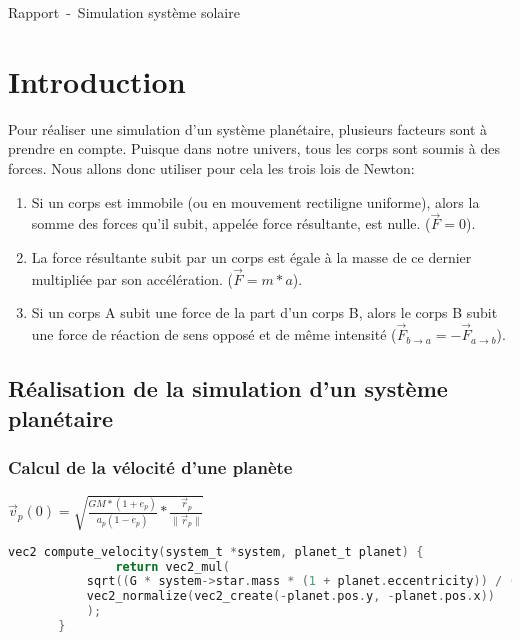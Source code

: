 \documentclass[a4paper,10pt]{article}
\title{\doctitle}
\author{\docauthor}
\date{\docdate}
\newcommand{\doctitle}{Rapport}
\newcommand{\docsubtitle}{Simulation système solaire}
\begin{document}
    \begin{center}
    {\huge \doctitle~-~\docsubtitle}\newline
    \end{center}

    \tableofcontents

    \newpage

    \section{Introduction}

    Pour réaliser une simulation d'un système planétaire, plusieurs facteurs sont à prendre en compte.
    Puisque dans notre univers, tous les corps sont soumis à des forces.
    Nous allons donc utiliser pour cela les trois lois de Newton:

    \begin{enumerate}
        \item Si un corps est immobile (ou en mouvement rectiligne uniforme), alors la somme des forces qu’il subit, appelée force résultante, est nulle. ($\vec{F} = 0$).
        \item La force résultante subit par un corps est égale à la masse de ce dernier multipliée par son accélération. ($\vec{F} = m * a$).
        \item Si un corps A subit une force de la part d’un corps B, alors le corps B subit une force de réaction de sens opposé et de même intensité ($\vec{F}_{b\to{a}} = -\vec{F}_{a\to{b}}$).
    \end{enumerate}
    
    \subsection{Réalisation de la simulation d'un système planétaire}\label{subsec:réalisation-de-la-simulation-d'un-système-planétaire}

    \subsubsection{Calcul de la vélocité d'une planète}

    $\vec{v}_{p}(0) = \sqrt{\frac{GM * (1 + e_{p})}{a_{p}(1 - e_{p})} * \frac{\vec{r}_{p}}{\|\vec{r}_{p}\|}}$

    \begin{lstlisting}[language=c,label={lst:lstlisting3}]
        vec2 compute_velocity(system_t *system, planet_t planet) {
               return vec2_mul(
           sqrt((G * system->star.mass * (1 + planet.eccentricity)) / (planet.semi_major_axis * (1 - planet.eccentricity))),
           vec2_normalize(vec2_create(-planet.pos.y, -planet.pos.x))
           );
       }
    \end{lstlisting}
    
\end{document}
